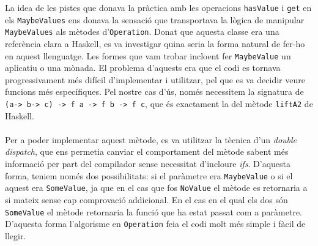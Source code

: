 
	La idea de les pistes que donava la pràctica amb les operacions 
	\texttt{hasValue} i \texttt{get} en els \texttt{MaybeValues} ens 
	donava la sensació que transportava la lògica de manipular \texttt{MaybeValues} als mètodes d'\texttt{Operation}.
	Donat que aquesta classe era una referència clara a Haskell, es va investigar quina seria la forma natural de fer-ho
	en aquest llenguatge. Les formes que vam trobar incloent fer \texttt{MaybeValue} un aplicatiu o una mònada. El problema
	d'aquests era que el codi es tornava progressivament més difícil d'implementar i utilitzar, pel que es va decidir veure
	funcions més específiques. Pel nostre cas d'ús, només necessitem
	 la signatura de \texttt{(a-> b-> c) -> f a -> f b -> f c},
	que és exactament la del mètode \texttt{liftA2} de Haskell.\\
	\\
	Per a poder implementar aquest mètode, es va utilitzar la tècnica d'un \textit{double dispatch}, que ens permetia canviar
	el comportament del mètode sabent més informació per part del compilador sense necessitat d'incloure \textit{ifs}.
	D'aquesta forma, teniem només dos possibilitats: si el paràmetre era \texttt{MaybeValue} o si el aquest era 
	\texttt{SomeValue}, ja que en el cas que fos \texttt{NoValue} el 
	mètode es retornaria a si mateix sense cap comprovació
	addicional. En el cas en el qual els dos són \texttt{SomeValue} el
	 mètode retornaria la funció que ha estat passat com a 
	paràmetre. D'aquesta forma l'algorisme en \texttt{Operation} 
	feia el codi molt més simple i fàcil de llegir.
